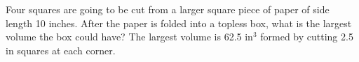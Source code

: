 {Four squares are going to be cut from a larger square piece of paper of side length 10 inches.  After the paper is folded into a topless box, what is the largest volume the box could have?
}
{The largest volume is 62.5 in$^3$ formed by cutting 2.5 in squares at each corner.}

